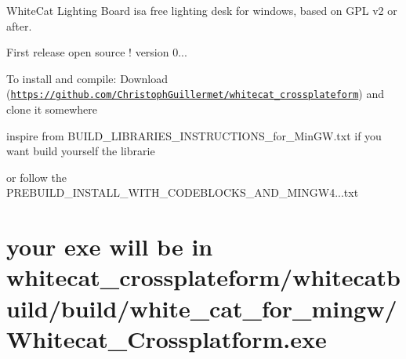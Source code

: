 White\-Cat Lighting Board isa free lighting desk for windows, based on G\-P\-L v2 or after.

First release open source ! version 0...

To install and compile\-: Download (\href{https://github.com/ChristophGuillermet/whitecat_crossplateform}{\tt https\-://github.\-com/\-Christoph\-Guillermet/whitecat\-\_\-crossplateform}) and clone it somewhere

inspire from B\-U\-I\-L\-D\-\_\-\-L\-I\-B\-R\-A\-R\-I\-E\-S\-\_\-\-I\-N\-S\-T\-R\-U\-C\-T\-I\-O\-N\-S\-\_\-for\-\_\-\-Min\-G\-W.\-txt if you want build yourself the librarie

or follow the P\-R\-E\-B\-U\-I\-L\-D\-\_\-\-I\-N\-S\-T\-A\-L\-L\-\_\-\-W\-I\-T\-H\-\_\-\-C\-O\-D\-E\-B\-L\-O\-C\-K\-S\-\_\-\-A\-N\-D\-\_\-\-M\-I\-N\-G\-W4...\-txt

\section*{your exe will be in whitecat\-\_\-crossplateform/whitecatbuild/build/white\-\_\-cat\-\_\-for\-\_\-mingw/\-Whitecat\-\_\-\-Crossplatform.\-exe }